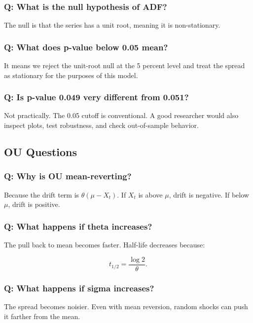 \documentclass[11pt]{article}
\begin{document}
\subsubsection{Q: What is the null hypothesis of ADF?}

The null is that the series has a unit root, meaning it is non-stationary.

\subsubsection{Q: What does p-value below 0.05 mean?}

It means we reject the unit-root null at the 5 percent level and treat the
spread as stationary for the purposes of this model.

\subsubsection{Q: Is p-value 0.049 very different from 0.051?}

Not practically. The 0.05 cutoff is conventional. A good researcher would also
inspect plots, test robustness, and check out-of-sample behavior.

\subsection{OU Questions}

\subsubsection{Q: Why is OU mean-reverting?}

Because the drift term is $\theta(\mu-X_t)$. If $X_t$ is above $\mu$, drift is
negative. If below $\mu$, drift is positive.

\subsubsection{Q: What happens if theta increases?}

The pull back to mean becomes faster. Half-life decreases because:

\[
t_{1/2}=\frac{\log 2}{\theta}.
\]

\subsubsection{Q: What happens if sigma increases?}

The spread becomes noisier. Even with mean reversion, random shocks can push it
farther from the mean.
\end{document}
